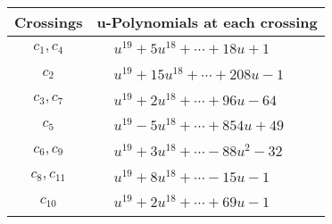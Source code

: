 \documentclass[1p]{elsarticle_modified}
\theoremstyle{definition}
\begin{document}
\begin{tabular}{m{50pt}|m{274pt}}
Crossings & \hspace{64pt}u-Polynomials at each crossing \\
\hline $$\begin{aligned}c_{1},c_{4}\end{aligned}$$&$\begin{aligned}
&u^{19}+5 u^{18}+\cdots+18 u+1
\end{aligned}$\\
\hline $$\begin{aligned}c_{2}\end{aligned}$$&$\begin{aligned}
&u^{19}+15 u^{18}+\cdots+208 u-1
\end{aligned}$\\
\hline $$\begin{aligned}c_{3},c_{7}\end{aligned}$$&$\begin{aligned}
&u^{19}+2 u^{18}+\cdots+96 u-64
\end{aligned}$\\
\hline $$\begin{aligned}c_{5}\end{aligned}$$&$\begin{aligned}
&u^{19}-5 u^{18}+\cdots+854 u+49
\end{aligned}$\\
\hline $$\begin{aligned}c_{6},c_{9}\end{aligned}$$&$\begin{aligned}
&u^{19}+3 u^{18}+\cdots-88 u^2-32
\end{aligned}$\\
\hline $$\begin{aligned}c_{8},c_{11}\end{aligned}$$&$\begin{aligned}
&u^{19}+8 u^{18}+\cdots-15 u-1
\end{aligned}$\\
\hline $$\begin{aligned}c_{10}\end{aligned}$$&$\begin{aligned}
&u^{19}+2 u^{18}+\cdots+69 u-1
\end{aligned}$\\
\hline
\end{tabular}\\~\\
\newpage\renewcommand{\arraystretch}{1}
\end{document}
